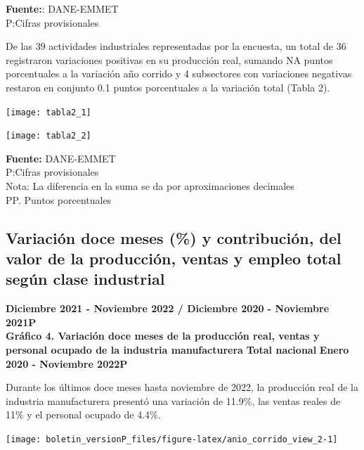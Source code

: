 \documentclass[
]{article}
\begin{document}
\textbf{Fuente:}: DANE-EMMET\\
P:Cifras provisionales\\

\newpage

De las 39 actividades industriales representadas por la encuesta, un
total de 36 registraron variaciones positivas en su producción real,
sumando NA puntos porcentuales a la variación año corrido y 4
subsectores con variaciones negativas restaron en conjunto 0.1 puntos
porcentuales a la variación total (Tabla 2).

\begin{center}\texttt{[image: tabla2\_1]} \end{center}

\begin{center}\texttt{[image: tabla2\_2]} \end{center}

\textbf{Fuente:} DANE-EMMET\\
P:Cifras provisionales\\
Nota: La diferencia en la suma se da por aproximaciones decimales\\
PP. Puntos porcentuales\\

\newpage

\hypertarget{variaciuxf3n-doce-meses-y-contribuciuxf3n-del-valor-de-la-producciuxf3n-ventas-y-empleo-total-seguxfan-clase-industrial}{%
\subsection{Variación doce meses (\%) y contribución, del valor de la
producción, ventas y empleo total según clase
industrial}\label{variaciuxf3n-doce-meses-y-contribuciuxf3n-del-valor-de-la-producciuxf3n-ventas-y-empleo-total-seguxfan-clase-industrial}}

\textbf{Diciembre 2021 - Noviembre 2022 / Diciembre 2020 - Noviembre 2021P}\\

\textbf{Gráfico 4. Variación doce meses de la producción real, ventas y
personal ocupado de la industria manufacturera} \textbf{Total nacional}
\textbf{Enero 2020 - Noviembre 2022P}

Durante los últimos doce meses hasta noviembre de 2022, la producción
real de la industria manufacturera presentó una variación de 11.9\%, las
ventas reales de 11\% y el personal ocupado de 4.4\%.\\

\begin{center}\texttt{[image: boletin\_versionP\_files/figure-latex/anio\_corrido\_view\_2-1]} \end{center}
\end{document}

